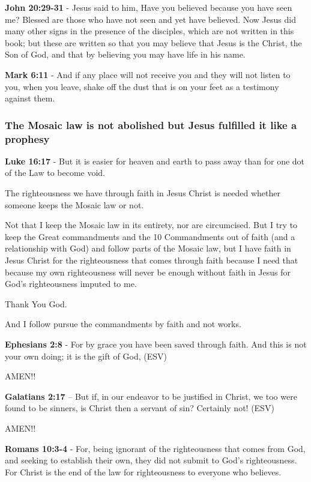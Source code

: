 \documentclass[11pt]{article}
\begin{document}
\textbf{John 20:29-31} - Jesus said to him, Have you believed because you have seen me? Blessed are those who have not seen and yet have believed.  Now Jesus did many other signs in the presence of the disciples, which are not written in this book; but these are written so that you may believe that Jesus is the Christ, the Son of God, and that by believing you may have life in his name.

\textbf{Mark 6:11} - And if any place will not receive you and they will not listen to you, when you leave, shake off the dust that is on your feet as a testimony against them.

\subsubsection{The Mosaic law is not abolished but Jesus fulfilled it like a prophesy}
\label{sec:org6ec3d3d}
\textbf{Luke 16:17} - But it is easier for heaven and earth to pass away than for one dot of the Law to become void.

The righteousness we have through faith in Jesus Christ is needed whether someone keeps the Mosaic law or not.

Not that I keep the Mosaic law in its entirety, nor are circumcised. But I try to keep the Great commandments
and the 10 Commandments out of faith (and a relationship with God) and follow parts of the Mosaic law,
but I have faith in Jesus Christ for the righteousness that comes through faith because I need that because my own
righteousness will never be enough without faith in Jesus for God's righteousness imputed to me.

Thank You God.

And I follow pursue the commandments by faith and not works.

\textbf{Ephesians 2:8} - For by grace you have been saved through faith. And this is not your own doing; it is the gift of God, (ESV)

AMEN!!

\textbf{Galatians 2:17} -- But if, in our endeavor to be justified in Christ, we too were found to be sinners, is Christ then a servant of sin? Certainly not! (ESV)

AMEN!!

\textbf{Romans 10:3-4} - For, being ignorant of the righteousness that comes from God, and seeking to establish their own, they did not submit to God's righteousness. For Christ is the end of the law for righteousness to everyone who believes.
\end{document}
